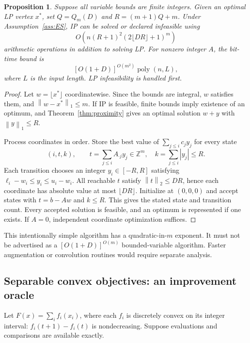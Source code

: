 \documentclass[11pt]{article}
\newtheorem{proposition}[theorem]{Proposition}
\theoremstyle{definition}
\theoremstyle{remark}
\newcommand{\Z}{\mathbb Z}
\newcommand{\norm}[1]{\left\lVert #1\right\rVert}
\newcommand{\poly}{\operatorname{poly}}
\begin{document}
\begin{proposition}\label{prop:boundedDP}
Suppose all variable bounds are finite integers. Given an optimal LP
vertex $x^*$, set $Q=Q_m(D)$ and $R=(m+1)Q+m$.
Under Assumption~\ref{ass:ES}, IP can be solved or declared infeasible
using
\[
 O\!\left(n(R+1)^2(2\lfloor DR\rfloor+1)^m\right)
 \tag{6}\label{eq:DPtime}
\]
arithmetic operations in addition to solving LP.
For nonzero integer $A$, the bit-time bound is
\[
 [O(1+D)]^{O(m^2)}\poly(n,L),
\]
where $L$ is the input length. LP infeasibility is handled first.
\end{proposition}
\begin{proof}
Let $w=\lfloor x^*\rfloor$ coordinatewise. Since the bounds are integral,
$w$ satisfies them, and $\norm{w-x^*}_1\le m$. If IP is feasible, finite
bounds imply existence of an optimum, and Theorem~\ref{thm:proximity}
gives an optimal solution $w+y$ with $\norm y_1\le R$.

Process coordinates in order. Store the best value of
$\sum_{j\le i}c_jy_j$ for every state
\[
 (i,t,k),\qquad t=\sum_{j\le i}A_{\cdot j}y_j\in\Z^m,
 \quad k=\sum_{j\le i}|y_j|\le R.
\]
Each transition chooses an integer $y_i\in[-R,R]$ satisfying
$\ell_i-w_i\le y_i\le u_i-w_i$. All reachable $t$ satisfy
$\norm t_2\le DR$, hence each coordinate has absolute value at most
$\lfloor DR\rfloor$. Initialize at $(0,0,0)$ and accept states with
$t=b-Aw$ and $k\le R$. This gives the stated state and transition count.
Every accepted solution is feasible, and an optimum is represented if
one exists. If $A=0$, independent coordinate optimization suffices.
\end{proof}

This intentionally simple algorithm has a quadratic-in-$m$ exponent.
It must not be advertised as a $[O(1+D)]^{O(m)}$ bounded-variable
algorithm. Faster augmentation or convolution routines would require
separate analysis.

\subsection{Separable convex objectives: an improvement oracle}

Let $F(x)=\sum_i f_i(x_i)$, where each $f_i$ is discretely convex on
its integer interval: $f_i(t+1)-f_i(t)$ is nondecreasing.
Suppose evaluations and comparisons are available exactly.
\end{document}
